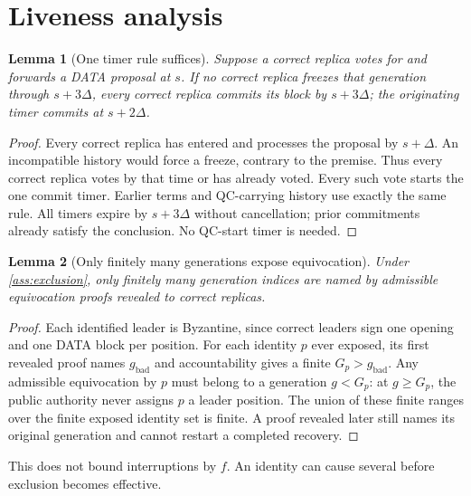 \documentclass[11pt,a4paper]{article}
\newtheorem{lemma}[lemma]{Lemma}
\begin{document}
\section{Liveness analysis}
\label{sec:liveness}
\begin{lemma}[One timer rule suffices]
\label{lem:window}
Suppose a correct replica votes for and forwards a DATA proposal at $s$.
If no correct replica freezes that generation through $s+3\Delta$, every
correct replica commits its block by $s+3\Delta$; the originating timer
commits at $s+2\Delta$.
\end{lemma}
\begin{proof}
Every correct replica has entered and processes the proposal by $s+\Delta$.
An incompatible history would force a freeze, contrary to the premise.
Thus every correct replica votes by that time or has already voted.
Every such vote starts the one commit timer. Earlier terms and
QC-carrying history use exactly the same rule. All timers expire by
$s+3\Delta$ without cancellation; prior commitments already satisfy
the conclusion. No QC-start timer is needed.
\end{proof}

\begin{lemma}[Only finitely many generations expose equivocation]
\label{lem:finite}
Under \cref{ass:exclusion}, only finitely many generation indices are
named by admissible equivocation proofs revealed to correct replicas.
\end{lemma}
\begin{proof}
Each identified leader is Byzantine, since correct leaders sign one
opening and one DATA block per position. For each identity $p$ ever exposed,
its first revealed proof names $g_{\mathrm{bad}}$ and accountability gives
a finite $G_p>g_{\mathrm{bad}}$. Any admissible equivocation by $p$ must
belong to a generation $g<G_p$: at $g\ge G_p$, the public authority
never assigns $p$ a leader position. The union of these finite ranges
over the finite exposed identity set is finite. A proof revealed later
still names its original generation and cannot restart a completed recovery.
\end{proof}
This does not bound interruptions by $f$. An identity can cause several
before exclusion becomes effective.
\end{document}
